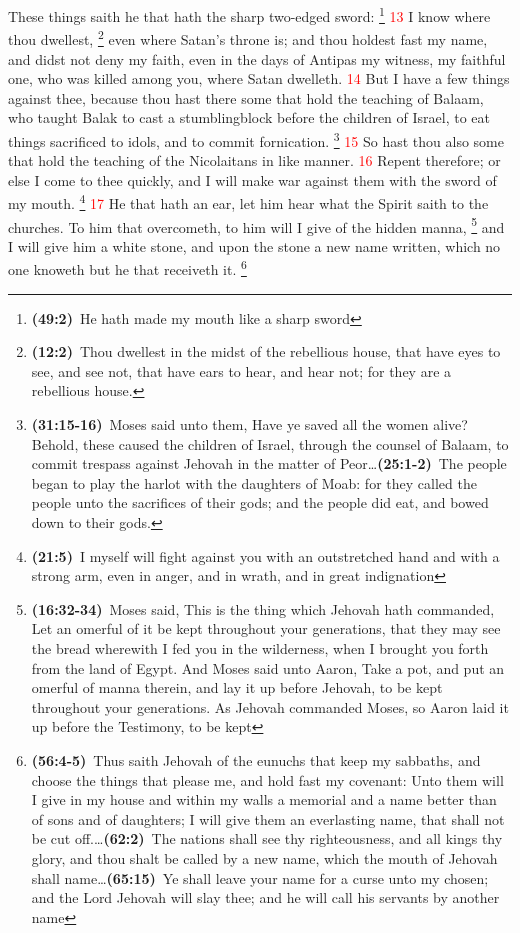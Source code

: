 \documentclass[12pt,twoside]{memoir}
\newcommand{\cbibleref}[3]{\textbf{\ibibleverse{#1}(#2)}\ {#3}}
\newcommand{\cbiblechvs}[3]{\textbf{\ibiblechvs{#1}(#2)}\ {#3}}
\newcommand{\cbiblefoot}[3]{\footnote{\cbibleref{#1}{#2}{#3}}}
\newcommand{\cbiblefootduosb}[5]{\footnote{\cbibleref{#1}{#2}{#3}\ldots \cbiblechvs{#1}{#4}{#5}}} %
\newcommand{\cbiblefoottriosb}[7]{\footnote{\cbibleref{#1}{#2}{#3}\ldots \cbiblechvs{#1}{#4}{#5}\ldots \cbiblechvs{#1}{#6}{#7}}}
\newcommand{\vnum}[1]{\textcolor{red}{\normalsize{#1}}}
\begin{document}
These things saith he that hath the sharp two-edged sword:%
	\cbiblefoot{Isaiah}{49:2}{He hath made my mouth like a sharp sword}%
\vnum{13} I know where thou dwellest,%
	\cbiblefoot{Ezekiel}{12:2}{Thou dwellest in the midst of the rebellious house, that have eyes to see, and see not, that have ears to hear, and hear not; for they are a rebellious house.}
 even where Satan’s throne is; and thou holdest fast my name, and didst not deny my faith, even in the days of Antipas my witness, my faithful one, who was killed among you, where Satan dwelleth. %
\vnum{14} But I have a few things against thee, because thou hast there some that hold the teaching of Balaam, who taught Balak to cast a stumblingblock before the children of Israel, to eat things sacrificed to idols, and to commit fornication.%
		\cbiblefootduosb{Numbers}{31:15-16}{Moses said unto them, Have ye saved all the women alive? Behold, these caused the children of Israel, through the counsel of Balaam, to commit trespass against Jehovah in the matter of Peor}%
								{25:1-2}{The people began to play the harlot with the daughters of Moab: for they called the people unto the sacrifices of their gods; and the people did eat, and bowed down to their gods.}
\vnum{15} So hast thou also some that hold the teaching of the Nicolaitans in like manner. %
\vnum{16} Repent therefore; or else I come to thee quickly, and I will make war against them with the sword of my mouth.%
	\cbiblefoot{Jeremiah}{21:5}{I myself will fight against you with an outstretched hand and with a strong arm, even in anger, and in wrath, and in great indignation}
\vnum{17} He that hath an ear, let him hear what the Spirit saith to the churches. To him that overcometh, to him will I give of the hidden manna,%
	\cbiblefoot{Exodus}{16:32-34}{Moses said, This is the thing which Jehovah hath commanded, Let an omerful of it be kept throughout your generations, that they may see the bread wherewith I fed you in the wilderness, when I brought you forth from the land of Egypt. And Moses said unto Aaron, Take a pot, and put an omerful of manna therein, and lay it up before Jehovah, to be kept throughout your generations. As Jehovah commanded Moses, so Aaron laid it up before the Testimony, to be kept} 
and I will give him a white stone, and upon the stone a new name written, which no one knoweth but he that receiveth it.
	\cbiblefoottriosb{Isaiah}{56:4-5}{Thus saith Jehovah of the eunuchs that keep my sabbaths, and choose the things that please me, and hold fast my covenant: Unto them will I give in my house and within my walls a memorial and a name better than of sons and of daughters; I will give them an everlasting name, that shall not be cut off.}%
					{62:2}{The nations shall see thy righteousness, and all kings thy glory, and thou shalt be called by a new name, which the mouth of Jehovah shall name}
					{65:15}{Ye shall leave your name for a curse unto my chosen; and the Lord Jehovah will slay thee; and he will call his servants by another name}
\end{document}
